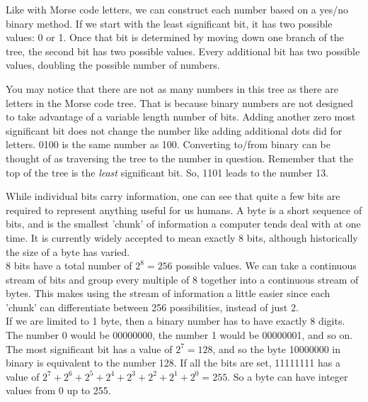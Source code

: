 Like with Morse code letters, we can  construct each number based on a yes/no binary method. If we start with the least significant bit, it has two possible values: 0 or 1. Once that bit is determined by moving down one branch of the tree, the second bit has two possible values. Every additional bit has two possible values, doubling the possible number of numbers.\\

\begin{center}\end{center}

You may notice that there are not as many numbers in this tree as there are letters in the Morse code tree. That is because binary numbers are not designed to take advantage of a variable length number of bits. Adding another zero most significant bit does not change the number like adding additional dots did for letters. 0100 is the same number as 100. Converting to/from binary can be thought of as traversing the tree to the number in question. Remember that the top of the tree is the \textit{least} significant bit. So, 1101 leads to the number 13.

\begin{center}\end{center}

While individual bits carry information, one can see that quite a few bits are required to represent anything useful for us humans. A byte is a short sequence of bits, and is the smallest 'chunk' of information a computer tends deal with at one time. It is currently widely accepted to mean exactly 8 bits, although historically the size of a byte has varied.\\

8 bits have a total number of $2^8=256$ possible values. We can take a continuous stream of bits and group every multiple of 8 together into a continuous stream of bytes. This makes using the stream of information a little easier since each 'chunk' can differentiate between 256 possibilities, instead of just 2.\\

If we are limited to 1 byte, then a binary number has to have exactly 8 digits. The number 0 would be 00000000, the number 1 would be 00000001, and so on. The most significant bit has a value of $2^7 = 128$, and so the byte 10000000 in binary is equivalent to the number 128. If all the bits are set, 11111111 has a value of $2^7 + 2^6 + 2^5 + 2^4 + 2^3 + 2^2 + 2^1 + 2^0 = 255$. So a byte can have integer values from 0 up to 255.\\

